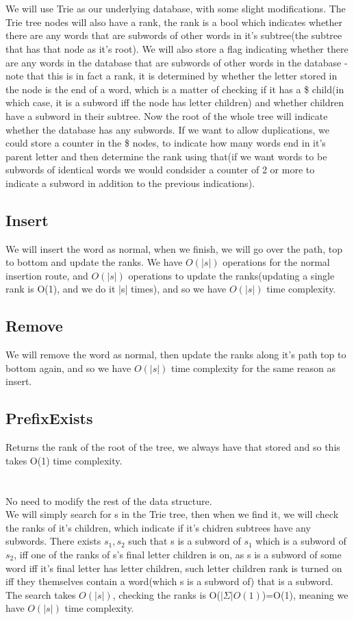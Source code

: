 \documentclass{article}
\begin{document}
\section{}
We will use Trie as our underlying database, with some slight modifications. The Trie tree nodes will also have a rank, the rank is a bool
which indicates whether there are any words that are subwords of other words
in it's subtree(the subtree that has that node as it's root).
We will also store a flag indicating whether there are any words in the 
database that are subwords of other words in the database - note that
this is in fact a rank, it is determined by whether the letter stored
in the node is the end of a word, which is a matter of checking if it has a \$ child(in which case, it is a subword iff the node has letter children) and whether children have a subword in their subtree.
Now the root of the whole tree will indicate whether the database has any subwords.
If we want to allow duplications, we could store a counter in the \$ nodes, to indicate how many words end in it's parent letter and then determine the rank using that(if we want words to be subwords of identical words we would condsider a counter of 2 or more to indicate a subword in addition to the previous indications). 
\subsection*{Insert}
We will insert the word as normal, when we finish, we will go over the path, top to bottom and update the ranks. We have $O(|s|)$ operations for the normal insertion route, and $O(|s|)$ operations to update the ranks(updating a single rank is O(1), and we do it |s| times), and so we have $O(|s|)$ time complexity.
\subsection*{Remove}
We will remove the word as normal, then update the ranks along it's path top to bottom again, and so we have $O(|s|)$ time complexity for the same reason as insert.
\subsection*{PrefixExists}
Returns the rank of the root of the tree, we always have that stored and so this takes O(1) time complexity.
\section{}
No need to modify the rest of the data structure.\\
We will simply search for s in the Trie tree, then when we find it, we will check the ranks of it's children, which indicate if it's chidren subtrees have any subwords. There exists $s_1, s_2$ such that s is a subword of $s_1$ which is a subword of $s_2$, iff one of the ranks of s's final letter children is on, as s is a subword of some word iff it's final letter has letter children, such letter children rank is turned on iff they themselves contain a word(which s is a subword of) that is a subword.
The search takes $O(|s|)$, checking the ranks is O($|\Sigma |O(1)$)=O(1), meaning we have $O(|s|)$ time complexity.
\end{document}
